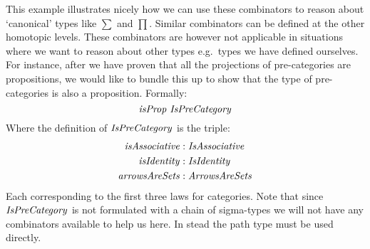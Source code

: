 This example illustrates nicely how we can use these combinators to
reason about `canonical' types like $∑$ and $∏$.  Similar
combinators can be defined at the other homotopic levels.  These
combinators are however not applicable in situations where we want to
reason about other types e.g.\ types we have defined ourselves.  For
instance, after we have proven that all the projections of
pre-categories are propositions, we would like to bundle this up to
show that the type of pre-categories is also a proposition.  Formally:
%
\begin{equation}
  \label{eq:propIsPreCategory}
  \isProp\ \IsPreCategory
\end{equation}
%
Where the definition of $\IsPreCategory$ is the triple:
%
\begin{align*}
  \var{isAssociative} & \tp \var{IsAssociative}\\
  \isIdentity    & \tp \var{IsIdentity}\\
  \var{arrowsAreSets} & \tp \var{ArrowsAreSets}
\end{align*}
%
Each corresponding to the first three laws for categories.  Note that
since $\IsPreCategory$ is not formulated with a chain of sigma-types
we will not have any combinators available to help us here.  In stead
the path type must be used directly.

